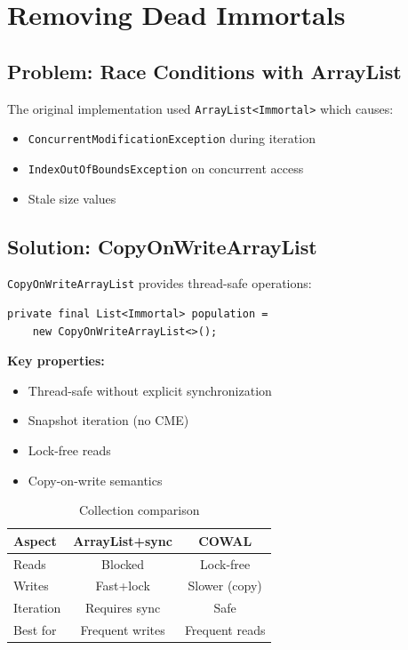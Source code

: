 \documentclass[10pt,a4paper,twocolumn]{article}
\begin{document}
\section{Removing Dead Immortals}

\subsection{Problem: Race Conditions with ArrayList}

The original implementation used \texttt{ArrayList<Immortal>} which causes:

\begin{itemize}
    \item \texttt{ConcurrentModificationException} during iteration
    \item \texttt{IndexOutOfBoundsException} on concurrent access
    \item Stale size values
\end{itemize}

\subsection{Solution: CopyOnWriteArrayList}

\texttt{CopyOnWriteArrayList} provides thread-safe operations:

\begin{lstlisting}[caption={Lock-Free Collection}]
private final List<Immortal> population = 
    new CopyOnWriteArrayList<>();
\end{lstlisting}

\textbf{Key properties:}
\begin{itemize}
    \item Thread-safe without explicit synchronization
    \item Snapshot iteration (no CME)
    \item Lock-free reads
    \item Copy-on-write semantics
\end{itemize}

\begin{table}[H]
    \centering
    \scriptsize
    \begin{tabular}{|l|c|c|}
        \hline
        \textbf{Aspect} & \textbf{ArrayList+sync} & \textbf{COWAL} \\
        \hline
        Reads & Blocked & Lock-free \\
        \hline
        Writes & Fast+lock & Slower (copy) \\
        \hline
        Iteration & Requires sync & Safe \\
        \hline
        Best for & Frequent writes & Frequent reads \\
        \hline
    \end{tabular}
    \caption{Collection comparison}
    \label{tab:collections}
\end{table}
\end{document}

